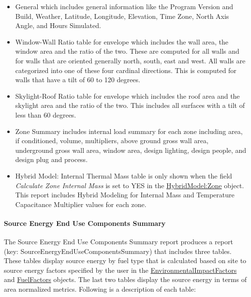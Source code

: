 \begin{itemize}
\item
  General which includes general information like the Program Version and Build, Weather, Latitude, Longitude, Elevation, Time Zone, North Axis Angle, and Hours Simulated.
\item
  Window-Wall Ratio table for envelope which includes the wall area, the window area and the ratio of the two. These are computed for all walls and for walls that are oriented generally north, south, east and west. All walls are categorized into one of these four cardinal directions. This is computed for walls that have a tilt of 60 to 120 degrees.
\item
  Skylight-Roof Ratio table for envelope which includes the roof area and the skylight area and the ratio of the two. This includes all surfaces with a tilt of less than 60 degrees.
\item
  Zone Summary includes internal load summary for each zone including area, if conditioned, volume, multipliers, above ground gross wall area, underground gross wall area, window area, design lighting, design people, and design plug and process.
\item
  Hybrid Model: Internal Thermal Mass table is only shown when the field \textit{Calculate Zone Internal Mass} is set to YES in the \hyperref[inputs-hm]{HybridModel:Zone} object. This report includes Hybrid Modeling for Internal Mass and Temperature Capacitance Multiplier values for each zone.
\end{itemize}

\paragraph{Source Energy End Use Components Summary}\label{source-energy-end-use-components-summary}

The Source Energy End Use Components Summary report produces a report (key: SourceEnergyEndUseComponentsSummary) that includes three tables. These tables display source energy by fuel type that is calculated based on site to source energy factors specified by the user in the \hyperref[environmentalimpactfactors]{EnvironmentalImpactFactors} and \hyperref[fuelfactors]{FuelFactors} objects. The last two tables display the source energy in terms of area normalized metrics. Following is a description of each table:

